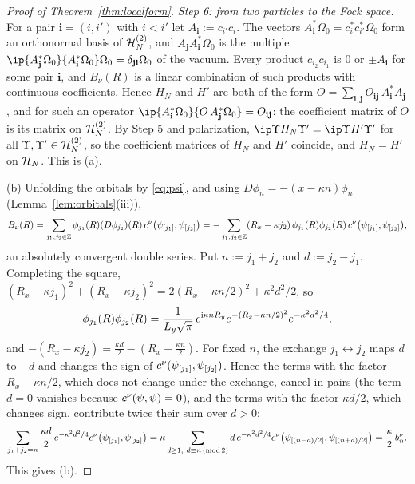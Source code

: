 \begin{proof}[Proof of Theorem~\ref{thm:localform}]
\emph{Step 6: from two particles to the Fock space.} For a pair $\mathbf i=(i,i')$ with $i<i'$ let $A_{\mathbf i}:=c_{i'}c_i$.
The vectors $A_{\mathbf i}^*\Omega_0=c_i^*c_{i'}^*\Omega_0$ form an orthonormal basis of $\mathcal{H}_N^{(2)}$, and
$A_{\mathbf j}A_{\mathbf i}^*\Omega_0$ is the multiple $\ip{A_{\mathbf j}^*\Omega_0}{A_{\mathbf i}^*\Omega_0}\Omega_0=\delta_{\mathbf j\mathbf i}\Omega_0$ of
the vacuum. Every product $c_{i_2}c_{i_1}$ is $0$ or $\pm A_{\mathbf i}$ for some pair $\mathbf i$, and $B_\nu(R)$ is a
linear combination of such products with continuous coefficients. Hence $H_N$ and $H'$ are both of the form
$O=\sum_{\mathbf i,\mathbf j}O_{\mathbf i\mathbf j}\,A_{\mathbf i}^*A_{\mathbf j}$, and for such an operator
$\ip{A_{\mathbf i}^*\Omega_0}{O\,A_{\mathbf j}^*\Omega_0}=O_{\mathbf i\mathbf j}$: the coefficient matrix of $O$ is its matrix on
$\mathcal{H}_N^{(2)}$. By Step 5 and polarization, $\ip\Upsilon{H_N\Upsilon'}=\ip\Upsilon{H'\Upsilon'}$ for all
$\Upsilon,\Upsilon'\in\mathcal{H}_N^{(2)}$, so the coefficient matrices of $H_N$ and $H'$ coincide, and $H_N=H'$ on $\mathcal{H}_N$. This is
(a).

(b) Unfolding the orbitals by \eqref{eq:psi}, and using $D\phi_n=-(x-\kappa n)\phi_n$ (Lemma~\ref{lem:orbitals}(iii)),
\[
B_\nu(R)=\sum_{j_1,j_2\in\mathbb{Z}}\phi_{j_1}(R)(D\phi_{j_2})(R)\,c^{\nu}\bigl(\psi_{[j_1]},\psi_{[j_2]}\bigr)
=-\sum_{j_1,j_2\in\mathbb{Z}}(R_x-\kappa j_2)\,\phi_{j_1}(R)\phi_{j_2}(R)\,c^{\nu}\bigl(\psi_{[j_1]},\psi_{[j_2]}\bigr),
\]
an absolutely convergent double series. Put $n:=j_1+j_2$ and $d:=j_2-j_1$. Completing the square,
$(R_x-\kappa j_1)^2+(R_x-\kappa j_2)^2=2(R_x-\kappa n/2)^2+\kappa^2d^2/2$, so
\[
\phi_{j_1}(R)\phi_{j_2}(R)=\frac1{L_y\sqrt\pi}\,e^{\mathrm{i}\kappa nR_y}e^{-(R_x-\kappa n/2)^2}e^{-\kappa^2d^2/4},
\]
and $-(R_x-\kappa j_2)=\frac{\kappa d}2-(R_x-\frac{\kappa n}2)$. For fixed $n$, the exchange $j_1\leftrightarrow j_2$ maps
$d$ to $-d$ and changes the sign of $c^{\nu}(\psi_{[j_1]},\psi_{[j_2]})$. Hence the terms with the factor
$R_x-\kappa n/2$, which does not change under the exchange, cancel in pairs (the term $d=0$ vanishes because
$c^{\nu}(\psi,\psi)=0$), and the terms with the factor $\kappa d/2$, which changes sign, contribute twice their sum
over $d>0$:
\[
\sum_{j_1+j_2=n}\frac{\kappa d}2\,e^{-\kappa^2d^2/4}c^{\nu}\bigl(\psi_{[j_1]},\psi_{[j_2]}\bigr)
=\kappa\sum_{d\ge1,\ d\equiv n\,(\mathrm{mod}\,2)}d\,e^{-\kappa^2d^2/4}c^{\nu}\bigl(\psi_{[(n-d)/2]},\psi_{[(n+d)/2]}\bigr)=\frac\kappa2\,b^{\nu}_{n} .
\]
This gives (b).


\end{proof}
